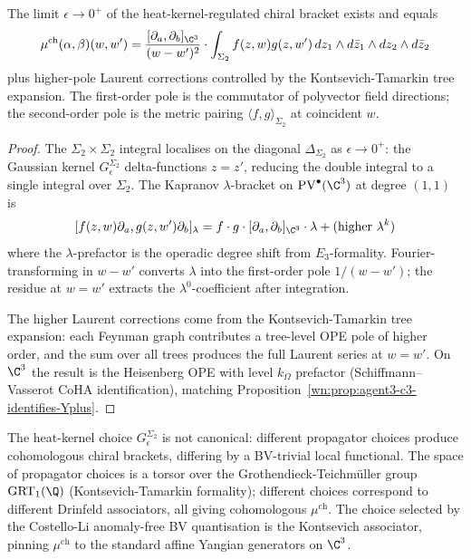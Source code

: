 \begin{proposition}
\label{wn:prop:agent3-heat-kernel-limit}
\ClaimStatusProvedHere
The limit $\epsilon\to 0^+$ of the heat-kernel-regulated chiral bracket exists and equals
\[
 \mu^{\mathrm{ch}}(\alpha,\beta)(w,w')
 =\frac{[\partial_a,\partial_b]_{\C^3}}{(w-w')^2}
 \cdot\int_{\Sigma_2}f(z,w)g(z,w')\,dz_1\wedge d\bar z_1\wedge dz_2\wedge d\bar z_2
\]
plus higher-pole Laurent corrections controlled by the Kontsevich-Tamarkin tree expansion. The first-order pole is the commutator of polyvector field directions; the second-order pole is the metric pairing $\langle f,g\rangle_{\Sigma_2}$ at coincident $w$.
\end{proposition}

\begin{proof}
The $\Sigma_2\times\Sigma_2$ integral localises on the diagonal $\Delta_{\Sigma_2}$ as $\epsilon\to 0^+$: the Gaussian kernel $G_\epsilon^{\Sigma_2}$ delta-functions $z=z'$, reducing the double integral to a single integral over $\Sigma_2$. The Kapranov $\lambda$-bracket on $\mathrm{PV}^\bullet(\C^3)$ at degree $(1,1)$ is
\[
 [f(z,w)\partial_a,g(z,w')\partial_b]_\lambda
 =f\cdot g\cdot[\partial_a,\partial_b]_{\C^3}\cdot\lambda+(\text{higher }\lambda^k)
\]
where the $\lambda$-prefactor is the operadic degree shift from $E_3$-formality. Fourier-transforming in $w-w'$ converts $\lambda$ into the first-order pole $1/(w-w')$; the residue at $w=w'$ extracts the $\lambda^0$-coefficient after integration.

The higher Laurent corrections come from the Kontsevich-Tamarkin tree expansion: each Feynman graph contributes a tree-level OPE pole of higher order, and the sum over all trees produces the full Laurent series at $w=w'$. On $\C^3$ the result is the Heisenberg OPE with level $k_\Omega$ prefactor (Schiffmann--Vasserot CoHA identification), matching Proposition~\ref{wn:prop:agent3-c3-identifies-Yplus}.
\end{proof}

\begin{remark}
\label{wn:rem:agent3-propagator-grt1}
The heat-kernel choice $G_\epsilon^{\Sigma_2}$ is not canonical: different propagator choices produce cohomologous chiral brackets, differing by a BV-trivial local functional. The space of propagator choices is a torsor over the Grothendieck-Teichm\"uller group $\mathrm{GRT}_1(\Q)$ (Kontsevich-Tamarkin formality); different choices correspond to different Drinfeld associators, all giving cohomologous $\mu^{\mathrm{ch}}$. The choice selected by the Costello-Li anomaly-free BV quantisation is the Kontsevich associator, pinning $\mu^{\mathrm{ch}}$ to the standard affine Yangian generators on $\C^3$.
\end{remark}

